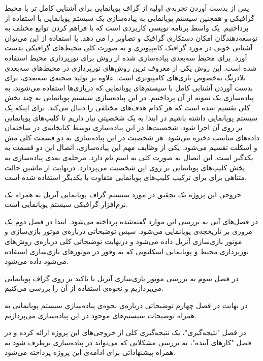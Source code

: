 پس از بدست آوردن تجربه‌ی اولیه از گراف پویانمایی برای آشنایی کامل تر 
با محیط گرافیکی و همچنین سیستم پویانمایی به پیاده‌سازی یک سیستم پویانمایی با استفاده از 
پرداختیم.
یک واسط برنامه نویسی کاربردی
است که با فراهم کردن توابع مختلف به توسعه‌دهندگان امکان دستکاری گرافیک و تصاویر را می ‌دهد.
با استفاده از این 
می‌توان آشنایی خوبی در مورد گرافیک کامپیوتری و به صورت کلی محیط‌های گرافیکی بدست آورد.
برای محیط سه‌بعدی پیاده‌سازی شده از روش 
برای نورپردازی محیط استفاده شده است. این روش یکی از معروف ترین روش‌های نورپردازی در محیط‌های سه‌بعدی بلادرنگ به‌خصوص بازی‌های کامپیوتری است. علاوه بر تولید صحنه‌ی سه‌بعدی،
برای بدست آوردن آشنایی کامل با سیستم‌های پویانمایی که دربازی‌ها استفاده می‌شوند، به پیاده‌سازی یک نمونه از آن پرداختیم.
در این پیاده‌سازی سیستم پویانمایی به چند بخش کلی تقسیم شده است که هر کدام هدف‌های مختلفی را دنبال می‌کند.
برای اینکه یک سیستم پویانمایی داشته باشیم در ابتدا به یک شخصیتی نیاز داریم 
تا کلیپ‌های پویانمایی بر روی آن اجرا شود.
شخصیت‌ها در این پیاده‌سازی توسط کتابخانه‌ی 
در ساختمان داده‌های مناسب ذخیره می‌شود.
هر شخصیت در این پیاده‌سازی به دو قسمت کلی مش و اسکلت تقسیم می‌شود.
یکی از وظایف مهم این پیاده‌سازی، اتصال این دو قسمت به یکدگیر 
است.
این اتصال به صورت کلی به اسم 
نام دارد. 
مرحله‌ی بعدی پیاده‌سازی به پخش کلیپ‌های پویانمایی بر روی این شخصیت می‌پردازد.
درنهایت از ماشین حالت متناهی برای برای ترکیب کلیپ‌های پویانمایی متفاوت با یکدیگر استفاده شده است.

خروجی این پروژه یک تحقیق در مورد سیستم گراف پویانمایی آنریل به همراه 
یک نرم‌افزار گرافیکی سیستم پویانمایی است.

در فصل‌های آتی به بررسی این موارد گفته‌شده پرداخته می‌شود.
ابتدا در فصل دوم یک مروری بر تاریخچه‌ی پویانمایی می‌شود. سپس توضیحاتی درباره‌ی موتور بازی‌سازی و 
موتور بازی‌سازی آنریل داده می‌شود و درنهایت توضیحاتی کلی 
درباره‌ی روش‌های نورپردازی محیط و پویانمایی اسکلتونی که به وفور در موتور‌های بازی‌سازی استفاده می‌شود داده می‌شود.

در فصل سوم به بررسی موتور بازی‌سازی آنریل با تاکید بر روی گراف پویانمایی می‌پردازیم و نحوه‌ی استفاده از آن را بررسی می‌کنیم.

در نهایت در فصل چهارم توضیحاتی درباره‌ی نحوه‌ی پیاده‌سازی سیستم پویانمایی
به همراه توضیحات سیستم‌های موجود در این پیاده‌سازی می‌پردازیم.

در فصل "نتیجه‌گیری"، یک نتیجه‌گیری کلی از خروجی‌های این پروژه ارائه کرده 
و در فصل "کارهای آینده"، به بررسی مشکلاتی که می‌تواند در پیاده‌سازی برطرف شود به همراه 
پیشنهاداتی برای ادامه‌ی این پروژه پرداخته می‌شود.

